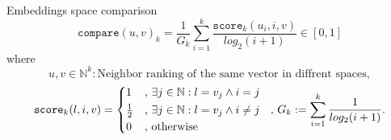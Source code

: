 \documentclass[aspectratio=1610,12pt]{beamer}
\begin{document}
\begin{frame}[t]{Embeddings space comparison}
  \[
    \texttt{compare}(u,v)_k = 
      \frac{1}{G_k} \sum^{k}_{i=1} 
      \frac{ \texttt{score}_{k}(u_i,i,v)}{log_2(i+1)} 
      \in [0,1]
  \]
  where
  \[ u,v \in \mathbb{N}^k: \text{Neighbor ranking of the same vector in diffrent spaces},\]
  \[
    \texttt{score}_k(l,i,v) = \begin{cases*} 
        1 & , $\exists j \in \mathbb{N}: l = v_j \land i = j$   \\
        \frac{1}{2} & , $\exists j \in \mathbb{N}: l = v_j \land i \neq j$\\
        0   & , \text{otherwise}
      \end{cases*}  \text{  , }
      G_k := \sum_{i=1}^{k} \frac{1}{log_2(i+1)}.
  \]
\end{frame}
\end{document}
